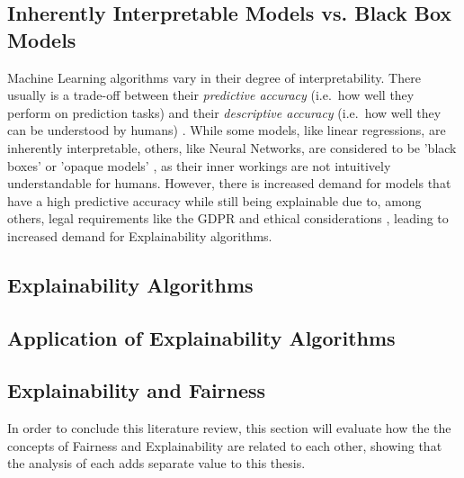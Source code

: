 \subsection{Inherently Interpretable Models vs. Black Box Models}\label{subsec:inherently}

Machine Learning algorithms vary in their degree of interpretability. There usually is a trade-off between their \textit{predictive accuracy} (i.e.\ how well they perform on prediction tasks) and their \textit{descriptive accuracy} (i.e.\ how well they can be understood by humans) \parencite{Murdoch2019}.
While some models, like linear regressions, are inherently interpretable, others, like Neural Networks, are considered to be 'black boxes' \parencite{Guidotti2018} or 'opaque models' \parencite{Burrell2016}, as their inner workings are not intuitively understandable for humans.
However, there is increased demand for models that have a high predictive accuracy while still being explainable due to, among others, legal requirements like the GDPR \parencite{GDPR} and ethical considerations \parencite{Guidotti2018}, leading to increased demand for Explainability algorithms.

\subsection{Explainability Algorithms}\label{subsec:algorithms}


\subsection{Application of Explainability Algorithms}\label{subsec:application}


\subsection{Explainability and Fairness}\label{subsec:explainability_fairness}

In order to conclude this literature review, this section will evaluate how the the concepts of Fairness and Explainability are related to each other, showing that the analysis of each adds separate value to this thesis.

